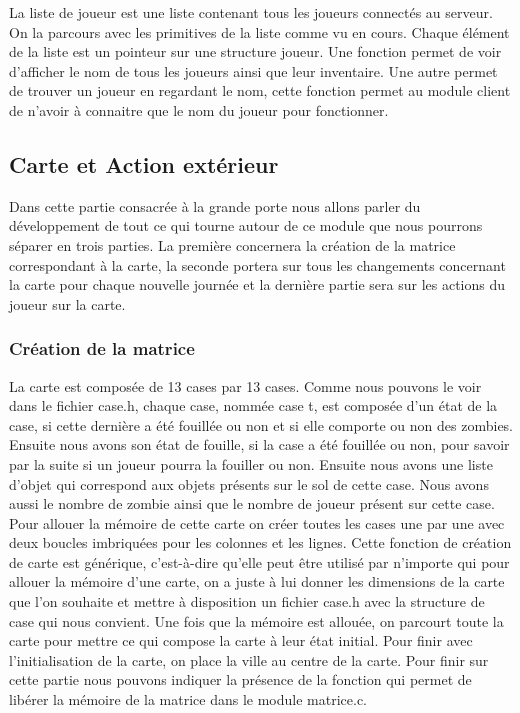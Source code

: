 \documentclass[a4paper,11pt]{article}
\begin{document}
La liste de joueur est une liste contenant tous les joueurs connectés au serveur. On la parcours avec les primitives de la liste comme vu en cours. Chaque élément de la liste est un pointeur sur une structure joueur. Une fonction permet de voir d'afficher le nom de tous les joueurs ainsi que leur inventaire. Une autre permet de trouver un joueur en regardant le nom, cette fonction permet au module client de n'avoir à connaitre que le nom du joueur pour fonctionner.

\newpage

\subsection{Carte et Action extérieur}

Dans cette partie consacrée à la grande porte nous allons parler du développement de tout ce qui tourne autour de ce module que nous pourrons séparer en trois parties. La première concernera la création de la matrice correspondant à la carte, la seconde portera sur tous les changements concernant la carte pour chaque nouvelle journée et la dernière partie sera sur les actions du joueur sur la carte.

\subsubsection{Création de la matrice}

La carte est composée de 13 cases par 13 cases. Comme nous pouvons le voir dans le fichier case.h, chaque case, nommée case t, est composée d’un état de la case, si cette dernière a été fouillée ou non et si elle comporte ou non des zombies. Ensuite nous avons son état de fouille, si la case a été fouillée ou non, pour savoir par la suite si un joueur pourra la fouiller ou non. Ensuite nous avons une liste d’objet qui correspond aux objets présents sur le sol de cette case. Nous avons aussi le nombre de zombie ainsi que le nombre de joueur présent sur cette case. Pour allouer la mémoire de cette carte on créer toutes les cases une par une avec deux boucles imbriquées pour les colonnes et les lignes. Cette fonction de création de carte est générique, c’est-à-dire qu’elle peut être utilisé par n’importe qui pour allouer la mémoire d’une carte, on a juste à lui donner les dimensions de la carte que l’on souhaite et mettre à disposition un fichier case.h avec la structure de case qui nous convient. Une fois que la mémoire est allouée, on parcourt toute la carte pour mettre ce qui compose la carte à leur état initial. Pour finir avec l’initialisation de la carte, on place la ville au centre de la carte. Pour finir sur cette partie nous pouvons indiquer la présence de la fonction qui permet de libérer la mémoire de la matrice dans le module matrice.c.
\end{document}
